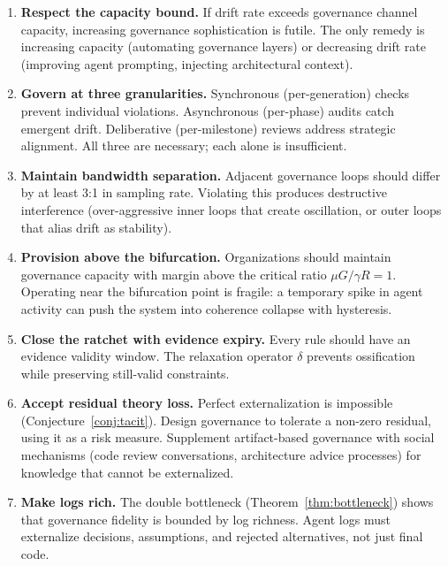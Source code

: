 \documentclass[11pt, a4paper, logo, copyright]{googledeepmind}
\begin{document}
\begin{enumerate}
    \item \textbf{Respect the capacity bound.} If drift rate exceeds governance channel capacity, increasing governance sophistication is futile. The only remedy is increasing capacity (automating governance layers) or decreasing drift rate (improving agent prompting, injecting architectural context).

    \item \textbf{Govern at three granularities.} Synchronous (per-generation) checks prevent individual violations. Asynchronous (per-phase) audits catch emergent drift. Deliberative (per-milestone) reviews address strategic alignment. All three are necessary; each alone is insufficient.

    \item \textbf{Maintain bandwidth separation.} Adjacent governance loops should differ by at least 3:1 in sampling rate. Violating this produces destructive interference (over-aggressive inner loops that create oscillation, or outer loops that alias drift as stability).

    \item \textbf{Provision above the bifurcation.} Organizations should maintain governance capacity with margin above the critical ratio $\mu G / \gamma R = 1$. Operating near the bifurcation point is fragile: a temporary spike in agent activity can push the system into coherence collapse with hysteresis.

    \item \textbf{Close the ratchet with evidence expiry.} Every rule should have an evidence validity window. The relaxation operator $\delta$ prevents ossification while preserving still-valid constraints.

    \item \textbf{Accept residual theory loss.} Perfect externalization is impossible (Conjecture~\ref{conj:tacit}). Design governance to tolerate a non-zero residual, using it as a risk measure. Supplement artifact-based governance with social mechanisms (code review conversations, architecture advice processes) for knowledge that cannot be externalized.

    \item \textbf{Make logs rich.} The double bottleneck (Theorem~\ref{thm:bottleneck}) shows that governance fidelity is bounded by log richness. Agent logs must externalize decisions, assumptions, and rejected alternatives, not just final code.


\end{enumerate}
\end{document}
